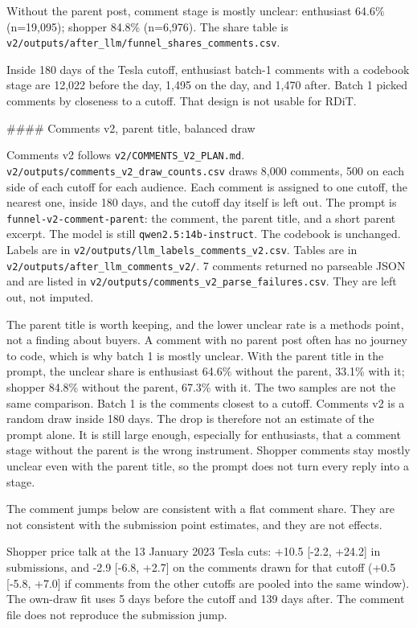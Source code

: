 \documentclass[11pt]{article}
\begin{document}
Without the parent post, comment stage is mostly unclear: enthusiast 64.6\% (n=19,095); shopper 84.8\% (n=6,976). The share table is \texttt{v2/outputs/after\_llm/funnel\_shares\_comments.csv}.


Inside 180 days of the Tesla cutoff, enthusiast batch-1 comments with a codebook stage are 12,022 before the day, 1,495 on the day, and 1,470 after. Batch 1 picked comments by closeness to a cutoff. That design is not usable for RDiT.


\#\#\#\# Comments v2, parent title, balanced draw


Comments v2 follows \texttt{v2/COMMENTS\_V2\_PLAN.md}. \texttt{v2/outputs/comments\_v2\_draw\_counts.csv} draws 8,000 comments, 500 on each side of each cutoff for each audience. Each comment is assigned to one cutoff, the nearest one, inside 180 days, and the cutoff day itself is left out. The prompt is \texttt{funnel-v2-comment-parent}: the comment, the parent title, and a short parent excerpt. The model is still \texttt{qwen2.5:14b-instruct}. The codebook is unchanged. Labels are in \texttt{v2/outputs/llm\_labels\_comments\_v2.csv}. Tables are in \texttt{v2/outputs/after\_llm\_comments\_v2/}. 7 comments returned no parseable JSON and are listed in \texttt{v2/outputs/comments\_v2\_parse\_failures.csv}. They are left out, not imputed.


The parent title is worth keeping, and the lower unclear rate is a methods point, not a finding about buyers. A comment with no parent post often has no journey to code, which is why batch 1 is mostly unclear. With the parent title in the prompt, the unclear share is enthusiast 64.6\% without the parent, 33.1\% with it; shopper 84.8\% without the parent, 67.3\% with it. The two samples are not the same comparison. Batch 1 is the comments closest to a cutoff. Comments v2 is a random draw inside 180 days. The drop is therefore not an estimate of the prompt alone. It is still large enough, especially for enthusiasts, that a comment stage without the parent is the wrong instrument. Shopper comments stay mostly unclear even with the parent title, so the prompt does not turn every reply into a stage.


The comment jumps below are consistent with a flat comment share. They are not consistent with the submission point estimates, and they are not effects.


Shopper price talk at the 13 January 2023 Tesla cuts: +10.5 [-2.2, +24.2] in submissions, and -2.9 [-6.8, +2.7] on the comments drawn for that cutoff (+0.5 [-5.8, +7.0] if comments from the other cutoffs are pooled into the same window). The own-draw fit uses 5 days before the cutoff and 139 days after. The comment file does not reproduce the submission jump.
\end{document}
